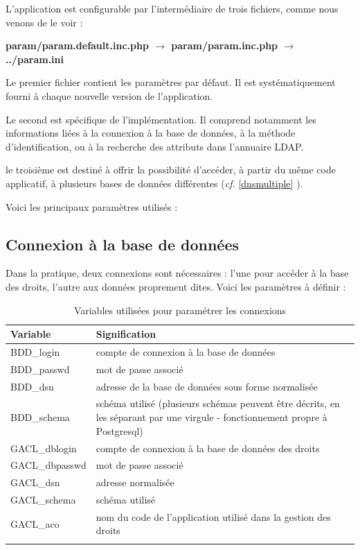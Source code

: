 L'application est configurable par l'intermédiaire de trois fichiers, comme nous venons de le voir :

\textbf{param/param.default.inc.php $\rightarrow$ param/param.inc.php $\rightarrow$ ../param.ini}

Le premier fichier contient les paramètres par défaut. Il est systématiquement fourni à chaque nouvelle version de l'application.

Le second est spécifique de l'implémentation. Il comprend notamment les informations liées à la connexion à la base de données, à la méthode d'identification, ou à la recherche des attributs dans l'annuaire LDAP. 

le troisième est destiné à offrir la possibilité d'accéder, à partir du même code applicatif, à plusieurs bases de données différentes (\textit{cf.} \ref{dnsmultiple} \textit{}).

Voici les principaux paramètres utilisés :

\subsection{Connexion à la base de données}

Dans la pratique, deux connexions sont nécessaires : l'une pour accéder à la base des droits, l'autre aux données proprement dites. Voici les paramètres à définir :

\begin{longtable}{|p{5cm}|p{10cm}|}
\hline
\textbf{Variable} & \textbf{Signification} \\
\hline
\endhead
BDD\_login & compte de connexion à la base de données \\
\hline
BDD\_passwd & mot de passe associé\\
\hline
BDD\_dsn & adresse de la base de données sous forme normalisée\\
\hline
BDD\_schema & schéma utilisé (plusieurs schémas peuvent être décrits, en les séparant par une virgule - fonctionnement propre à Postgresql)\\
\hline
GACL\_dblogin & compte de connexion à la base de données des droits\\
\hline
GACL\_dbpasswd & mot de passe associé\\
\hline
GACL\_dsn & adresse normalisée \\
\hline
GACL\_schema & schéma utilisé\\
\hline
GACL\_aco & nom du code de l'application utilisé dans la gestion des droits\\
\hline
\caption{Variables utilisées pour paramétrer les connexions}
\end{longtable}

